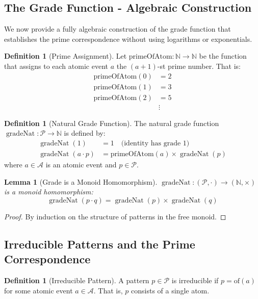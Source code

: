 \documentclass[12pt]{article}
\newtheorem{lemma}[theorem]{Lemma}
\theoremstyle{definition}
\newtheorem{definition}[theorem]{Definition}
\theoremstyle{remark}
\newcommand{\N}{\mathbb{N}}
\DeclareMathOperator{\gradeNat}{gradeNat}
\newcommand{\Pattern}{\mathcal{P}}
\begin{document}
\subsection{The Grade Function - Algebraic Construction}

We now provide a fully algebraic construction of the grade function that establishes the prime correspondence without using logarithms or exponentials.

\begin{definition}[Prime Assignment]
Let $\text{primeOfAtom}: \N \to \N$ be the function that assigns to each atomic event $a$ the $(a+1)$-st prime number. That is:
\begin{align}
\text{primeOfAtom}(0) &= 2\\
\text{primeOfAtom}(1) &= 3\\
\text{primeOfAtom}(2) &= 5\\
&\vdots
\end{align}
\end{definition}

\begin{definition}[Natural Grade Function]
The natural grade function $\gradeNat: \Pattern \to \N$ is defined by:
\begin{align}
\gradeNat(1) &= 1 \quad \text{(identity has grade 1)}\\
\gradeNat(a \cdot p) &= \text{primeOfAtom}(a) \times \gradeNat(p)
\end{align}
where $a \in \mathcal{A}$ is an atomic event and $p \in \Pattern$.
\end{definition}

\begin{lemma}[Grade is a Monoid Homomorphism]
$\gradeNat: (\Pattern, \cdot) \to (\N, \times)$ is a monoid homomorphism:
$$\gradeNat(p \cdot q) = \gradeNat(p) \times \gradeNat(q)$$
\end{lemma}

\begin{proof}
By induction on the structure of patterns in the free monoid.
\end{proof}

\subsection{Irreducible Patterns and the Prime Correspondence}

\begin{definition}[Irreducible Pattern]
A pattern $p \in \Pattern$ is irreducible if $p = \text{of}(a)$ for some atomic event $a \in \mathcal{A}$. That is, $p$ consists of a single atom.
\end{definition}
\end{document}
